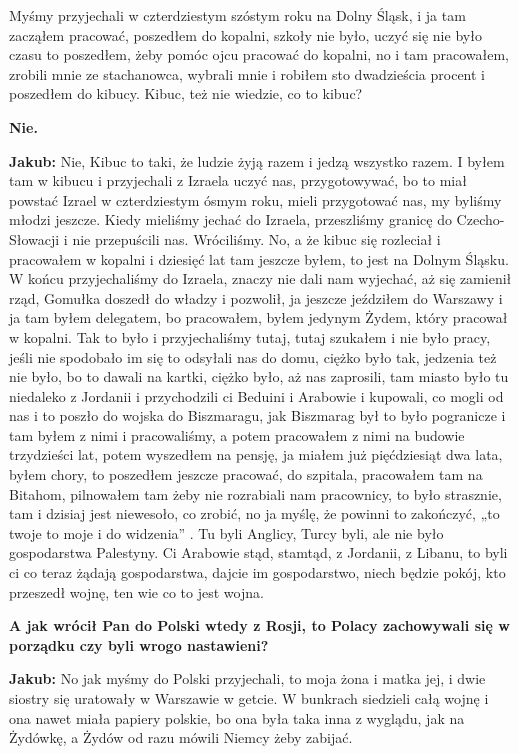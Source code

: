 Myśmy przyjechali w czterdziestym szóstym roku na Dolny Śląsk, i ja tam zacząłem pracować, poszedłem do kopalni, szkoły nie było, uczyć się nie było czasu to poszedłem, żeby pomóc ojcu pracować do kopalni, no i tam pracowałem, zrobili mnie ze stachanowca, wybrali mnie i robiłem sto dwadzieścia  procent i poszedłem do kibucy. Kibuc, też nie wiedzie, co to kibuc? 

\textbf{Nie.}

\textbf{Jakub:} Nie, Kibuc to taki, że ludzie żyją razem i jedzą wszystko razem. I byłem tam w kibucu i przyjechali z Izraela uczyć nas, przygotowywać, bo to miał powstać Izrael w czterdziestym ósmym roku, mieli przygotować nas, my byliśmy młodzi jeszcze. Kiedy mieliśmy jechać do Izraela, przeszliśmy granicę do Czecho-Słowacji i nie przepuścili nas. Wróciliśmy. No, a że kibuc się rozleciał i pracowałem w kopalni i dziesięć lat tam jeszcze byłem, to jest na Dolnym Śląsku. W końcu przyjechaliśmy do Izraela, znaczy nie dali nam wyjechać, aż się zamienił rząd, Gomułka doszedł do władzy i pozwolił, ja jeszcze jeździłem do Warszawy i ja tam byłem delegatem, bo pracowałem, byłem jedynym Żydem, który pracował w kopalni. Tak to było i przyjechaliśmy tutaj, tutaj szukałem i nie było pracy, jeśli nie spodobało im się to odsyłali nas do domu, ciężko było tak, jedzenia też nie było, bo to dawali na kartki, ciężko było, aż nas zaprosili, tam miasto było tu niedaleko z Jordanii i przychodzili ci Beduini      i Arabowie i kupowali, co mogli od nas i to poszło do wojska do Biszmaragu, jak Biszmarag był to było pogranicze i tam byłem z nimi i pracowaliśmy, a potem pracowałem z nimi na budowie trzydzieści lat, potem wyszedłem na pensję, ja miałem już pięćdziesiąt dwa lata, byłem chory, to poszedłem jeszcze pracować, do szpitala, pracowałem tam na Bitahom, pilnowałem tam żeby nie rozrabiali nam pracownicy, to było strasznie, tam i dzisiaj jest niewesoło, co zrobić, no ja myślę, że powinni to zakończyć, „to twoje to moje i do widzenia” . Tu byli Anglicy, Turcy byli, ale nie było gospodarstwa Palestyny. Ci Arabowie stąd, stamtąd, z Jordanii, z Libanu, to byli ci co teraz żądają  gospodarstwa, dajcie im gospodarstwo, niech będzie pokój, kto przeszedł wojnę, ten wie co to jest wojna. 

\textbf{A jak wrócił Pan do Polski wtedy z Rosji, to Polacy zachowywali się w porządku czy byli wrogo nastawieni?} 

\textbf{Jakub:} No jak myśmy do Polski przyjechali, to moja żona i matka jej, i dwie siostry się uratowały w Warszawie w getcie. W bunkrach siedzieli całą wojnę i ona nawet miała papiery polskie, bo ona była taka inna z wyglądu, jak na Żydówkę, a Żydów od razu mówili Niemcy żeby zabijać. 

